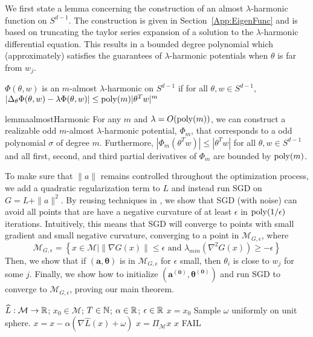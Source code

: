 %
We first state a lemma concerning the construction of an almost
$\lambda$-harmonic function on $S^{d-1}.$ The construction is given in
Section~\ref{App:EigenFunc} and is based on truncating the taylor
series expansion of a solution to the $\lambda$-harmonic differential
equation. This results in a bounded degree polynomial which
(approximately) satisfies the guarantees of $\lambda$-harmonic
potentials when $\theta$ is far from $w_j$. 
%
\begin{definition}
$\Phi(\theta, w)$ is an $m$-almost $\lambda$-harmonic on $S^{d-1}$ if for
all $\theta, w\in S^{d-1}$, $|\Delta_{\theta}\Phi(\theta, w) - \lambda \Phi (\theta,w)| \leq \mathrm{poly}(m)|\theta^Tw|^m$ 
\end{definition}
%
%
\begin{restatable}{lemma}{almostHarmonic}\label{AlmostHarmonic}
For any $m$ and $\lambda = O(\mathrm{poly}(m))$,  we can construct a realizable odd $m$-almost $\lambda$-harmonic potential, $\Phi_m$, that corresponds to a odd polynomial $\sigma$ of degree $m$. Furthermore, $|\Phi_m(\theta^Tw)|\leq |\theta^Tw|$ for all $\theta, w \in S^{d-1}$ and all first, second, and third partial derivatives of $\Phi_m$ are bounded by $\mathrm{poly}(m)$.
\end{restatable} 
%
To make sure that $\|a\|$ remains controlled throughout the optimization process, we add a quadratic regularization term to $L$ and instead run SGD on $G = L + \|a\|^2$. By reusing techniques in \cite{GeHJY15}, we show that SGD (with noise) can avoid all points that are have a negative curvature of at least $\epsilon$ in $\mathrm{poly}(1/\epsilon)$ iterations. Intuitively, this means that SGD will converge to points with small gradient and small negative curvature, converging to a point in $\mathcal{M}_{G, \epsilon}$, where 
%
\[\mathcal{M}_{G, \epsilon} = \left\{x\in \mathcal{M} \Big| \|\nabla G(x)\|
  \leq \epsilon \text{ and } \lambda_{min}(\nabla^2 G(x)) \geq
  -\epsilon\right\}\]
%
Then, we show that if $(\boldsymbol{a,\theta})$ is in $\mathcal{M}_{G, \epsilon}$ for $\epsilon$ small, then $\theta_i$ is close to $w_j$ for some $j$. Finally, we show how to initialize $(\boldsymbol{a^{(0)},\theta^{(0)}})$ and run SGD to converge to $\mathcal{M}_{G,\epsilon}$, proving our main theorem.
%
\begin{algorithm}[hb]
 \caption{$x = SGD(\widehat{L}, x_0, T,\alpha,\epsilon)$}
   \label{SGD}
\begin{algorithmic}
    $\widehat{L}:\mathcal{M} \to {\mathbb{R}}$; $x_0 \in \mathcal{M}$; $T\in {\mathbb{N}}$; $\alpha \in {\mathbb{R}}$; $\epsilon\in{\mathbb{R}}$
   \vspace{.1in}
    $x = x_0$
   \STATE Sample $\omega$ uniformly on unit sphere.
   \STATE $x = x - \alpha(\nabla \widehat{L} (x)+\omega)$ 
   \STATE $x = \Pi_\mathcal{M} x$
    $x$
   \ENDIF
   \ENDFOR
    FAIL
\end{algorithmic}
\end{algorithm}
